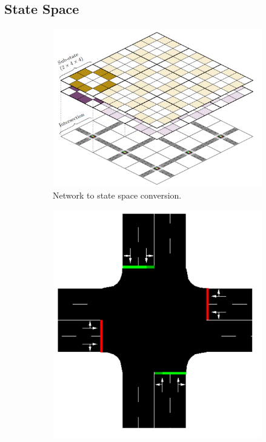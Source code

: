 \documentclass{article}
\begin{document}
    \subsection{State Space}
    \begin{figure}[h]
        \centering
        \begin{subfigure}[b]{0.6\linewidth}
            \includegraphics[width=\linewidth]{figs/state-space.png}
            \caption{Network to state space conversion.}
        \end{subfigure}
        \begin{subfigure}[b]{0.3\linewidth}
            \includegraphics[width=\linewidth]{figs/intersection.png}

\end{subfigure}
\end{figure}
\end{document}
